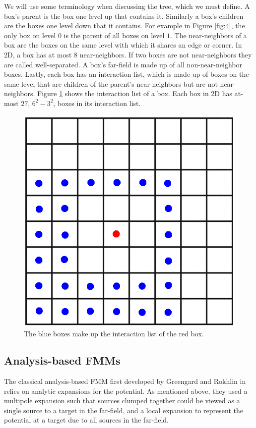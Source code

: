 \documentclass[11pt, oneside]{article}   	%
\begin{document}
We will use some terminology when discussing the tree, which we must define. A box's parent is the box one level up that contains it. Similarly a box's children are the boxes one level down that it contains. For example in Figure \ref{fig:4}, the only box on level $0$ is the parent of all boxes on level $1$. The near-neighbors of a box are the boxes on the same level with which it shares an edge or corner. In 2D, a box has at most $8$ near-neighbors. If two boxes are not near-neighbors they are called well-separated. A box's far-field is made up of all non-near-neighbor boxes. Lastly, each box has an interaction list, which is made up of boxes on the same level that are children of the parent's near-neighbors but are not near-neighbors. Figure \ref{fig:5} shows the interaction list of a box. Each box in 2D has at-most $27$, $6^2-3^2$, boxes in its interaction list.

\begin{figure}[h]
\caption{The blue boxes make up the interaction list of the red box.}
\label{fig:5}
\centering
\includegraphics[scale=0.25]{./images/intlist}
\end{figure}

\subsection{Analysis-based FMMs}
The classical analysis-based FMM first developed by Greengard and Rokhlin in \cite{GR} relies on analytic expansions for the potential. As mentioned above, they used a multipole expansion such that sources clumped together could be viewed as a single source to a target in the far-field, and a local expansion to represent the potential at a target due to all sources in the far-field.
\end{document}
